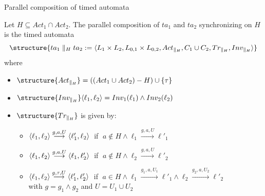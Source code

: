 \documentclass[aspectratio=169]{beamer}
\def\tran#1{\stackrel{#1}{\longrightarrow}}
\begin{document}
\begin{slide}{Parallel composition of timed automata}
\small

Let $H \subseteq Act_1 \cap Act_2$. The parallel composition of $ta_1$ and  $ta_2$ synchronizing on $H$
is the timed automata
\begin{equation*}
\structure{ta_1 \parallel_H ta_2 := \pair{L_1 \times L_2, L_{0,1} \times L_{0,2}, Act_{\parallel_H}, C_1 \cup C_2, Tr_{\parallel_H}, Inv_{\parallel_H}}}
\end{equation*}
where
\begin{itemize}
\item $\structure{Act_{\parallel_H}} = ((Act_1 \cup Act_2) - H) \cup \set{\tau}$
\item $\structure{Inv_{\parallel_H}} \pair{\ell_1,\ell_2} = Inv_1(\ell_1) \land  Inv_2(\ell_2)$
\item $\structure{Tr_{\parallel_H}}$ is given by:
\begin{itemize}
\item $\pair{\ell_1,\ell_2} \tran{g,a,U} \pair{\ell'_1,\ell_2}\; $ if $\; a \not \in H \land  \ell_1 \tran{g,a,U} \ell'_1 $
\item $\pair{\ell_1,\ell_2} \tran{g,a,U} \pair{\ell_1,\ell'_2}\; $ if $\; a \not \in H \land   \ell_2 \tran{g,a,U} \ell'_2$
\item $\pair{\ell_1,\ell_2} \tran{g,\tau,U} \pair{\ell'_1,\ell'_2}\; $ if $\; a \in H \land  \ell_1 \tran{g_1,a,U_1} \ell'_1 \land \ell_2 \tran{g_2,a,U_2} \ell'_2$\\
with $g = g_1 \land g_2$ and $U = U_1 \cup U_2$
\end{itemize}
\end{itemize}
\end{slide}
\end{document}
